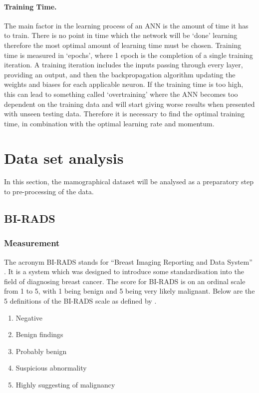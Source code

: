 \documentclass[12pt]{article}
\begin{document}
        \paragraph{Training Time.}
          The main factor in the learning process of an ANN is the amount of time it has to train. There is no point in time which the network will be ‘done’ learning therefore the most optimal amount of learning time must be chosen. Training time is measured in ‘epochs’, where 1 epoch is the completion of a single training iteration. A training iteration includes the inputs passing through every layer, providing an output, and then the backpropagation algorithm updating the weights and biases for each applicable neuron. If the training time is too high, this can lead to something called ‘overtraining’ where the ANN becomes too dependent on the training data and will start giving worse results when presented with unseen testing data. Therefore it is necessary to find the optimal training time, in combination with the optimal learning rate and momentum.

\section{Data set analysis} \label{data-set-analysis}
  In this section, the mamographical dataset will be analysed as a preparatory step to pre-processing of the data.

    \subsection{BI-RADS} \label{birad}
      \subsubsection{Measurement}
        The acronym BI-RADS stands for “Breast Imaging Reporting and Data System” \citep{american1998breast}. It is a system which was designed to introduce some standardisation into the field of diagnosing breast cancer. The score for BI-RADS is on an ordinal scale from 1 to 5, with 1 being benign and 5 being very likely malignant.
        Below are the 5 definitions of the BI-RADS scale as defined by \cite{american1998breast}.

        \begin{enumerate}[label=\arabic*)]
          \item Negative
          \item Benign findings
          \item Probably benign
          \item Suspicious abnormality
          \item Highly suggesting of malignancy
        \end{enumerate}
\end{document}
